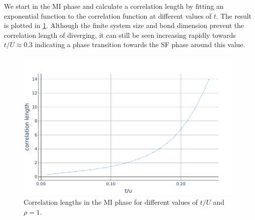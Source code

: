 \documentclass[twoside,twocolumn,9pt]{article}
\begin{document}
We start in the MI phase and calculate a correlation length by fitting an exponential function to the correlation function at different values of $t$. The result is plotted in \cref{fig:cor lengths}. Although the finite system size and bond dimension prevent the correlation length of diverging, it can still be seen increasing rapidly towards $t/U\approx 0.3$ indicating a phase transition towards the SF phase around this value.
\begin{center}
  \begin{figure}
      \includegraphics[width=\linewidth]{../code/figures/Correlations-length-values.pdf}
      \caption{Correlation lengths in the MI phase for different values of $t/U$ and $\rho=1$.}
      \label{fig:cor lengths}
  \end{figure}
\end{center}
\end{document}
